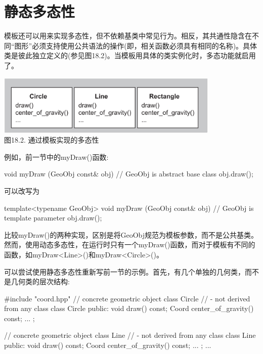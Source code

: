 \section{静态多态性}

模板还可以用来实现多态性，但不依赖基类中常见行为。相反，其共通性隐含在不同“图形”必须支持使用公共语法的操作(即，相关函数必须具有相同的名称)。具体类是彼此独立定义的(参见图18.2)。当模板用具体的类实例化时，多态功能就启用了。

\begin{center}
\includegraphics[width=0.8\textwidth]{part3/ch18/images/2.png} \\
图18.2. 通过模板实现的多态性
\end{center}

例如，前一节中的myDraw()函数:

\begin{cpp}
void myDraw (GeoObj const& obj) // GeoObj is abstract base class
{
	obj.draw();
}
\end{cpp}

可以改写为

\begin{cpp}
template<typename GeoObj>
void myDraw (GeoObj const& obj) // GeoObj is template parameter
{
	obj.draw();
}
\end{cpp}

比较myDraw()的两种实现，区别是将GeoObj规范为模板参数，而不是公共基类。然而，使用动态多态性，在运行时只有一个myDraw()函数，而对于模板有不同的函数，如myDraw<Line>()和myDraw<Circle>()。

可以尝试使用静态多态性重新写前一节的示例。首先，有几个单独的几何类，而不是几何类的层次结构:

\begin{cpp}
#include "coord.hpp"
// concrete geometric object class Circle
// - not derived from any class
class Circle {
	public:
	void draw() const;
	Coord center_of_gravity() const;
	...
};

// concrete geometric object class Line
// - not derived from any class
class Line {
	public:
	void draw() const;
	Coord center_of_gravity() const;
	...
};
...
\end{cpp}

